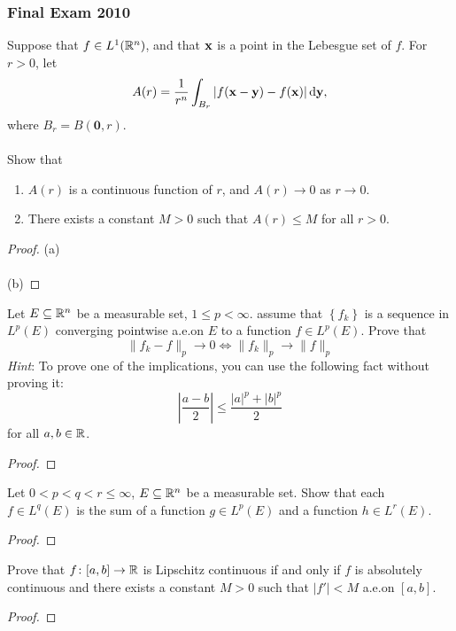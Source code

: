 \subsubsection{Final Exam 2010}
\setcounter{exercise}{0}

\begin{problem}
Suppose that $f\in L^1(\mathbb{R}^n)$, and that $\mathbf{x}$ is a point in the Lebesgue
set of $f$. For $r>0$, let
\[
A(r)= \frac{1}{r^n}\int_{B_r}|f(\mathbf{x}-\mathbf{y})-f(\mathbf{x})|\mathop{}\!\mathrm{d}\mathbf{y},
\]
where $B_r= B(\mathbf{0},r)$.
\\\\
Show that
\begin{enumerate}[label=(\alph*),noitemsep]
\item $A(r)$ is a continuous function of $r$, and $A(r)\to 0$ as $r\to 0$.
\item There exists a constant $M>0$ such that $A(r)\leq M$ for all $r>0$.
\end{enumerate}
\end{problem}
\begin{proof}
(a)
\\\\
(b)
\end{proof}

\begin{problem}
Let $E\subseteq\mathbb{R}^n$ be a measurable set, $1\leq p<\infty$. assume that
$\left\{ f_k \right\}$ is a sequence in $L^p(E)$ converging pointwise
a.e.\@ on $E$ to a function $f\in L^p(E)$. Prove that
\[
\|f_k-f\|_p\longrightarrow 0\iff
\|f_k\|_p\longrightarrow\|f\|_p
\]
\emph{Hint}: To prove one of the implications, you can use the following
fact without proving it:
\[
\left|
\frac{a-b}{2}
\right|
\leq
\frac{|a|^p+|b|^p}{2}
\]
for all $a,b\in\mathbb{R}$.
\end{problem}
\begin{proof}
\end{proof}

\begin{problem}
Let $0<p<q<r\leq\infty$, $E\subseteq\mathbb{R}^n$ be a measurable set. Show that
each $f\in L^q(E)$ is the sum of a function $g\in L^p(E)$ and a function
$h\in L^r(E)$.
\end{problem}
\begin{proof}
\end{proof}

\begin{problem}
Prove that $f\colon[a,b]\to\mathbb{R}$ is Lipschitz continuous if and only if $f$
is absolutely continuous and there exists a constant $M>0$ such that
$|f'|<M$ a.e.\@ on $[a,b]$.
\end{problem}
\begin{proof}
\end{proof}

